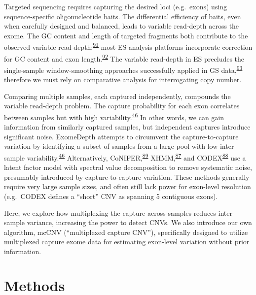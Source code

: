 \documentclass[11pt,letterpaper]{book}
\begin{document}
Targeted sequencing requires capturing the desired loci (e.g.~exons) using sequence-specific oligonucleotide baits.
The differential efficiency of baits, even when carefully designed and balanced, leads to variable read-depth across the exome.
The GC content and length of targeted fragments both contribute to the observed variable read-depth;\textsuperscript{\protect\hyperlink{ref-benjamini:2012aa}{91}} most ES analysis platforms incorporate correction for GC content and exon length.\textsuperscript{\protect\hyperlink{ref-kadalayil:2015aa}{92}}
The variable read-depth in ES precludes the single-sample window-smoothing approaches successfully applied in GS data,\textsuperscript{\protect\hyperlink{ref-chiang:2009aa}{93}} therefore we must rely on comparative analysis for interrogating copy number.

Comparing multiple samples, each captured independently, compounds the variable read-depth problem.
The capture probability for each exon correlates between samples but with high variability.\textsuperscript{\protect\hyperlink{ref-plagnol:2012aa}{46}}
In other words, we can gain information from similarly captured samples, but independent captures introduce significant noise.
ExomeDepth attempts to circumvent the capture-to-capture variation by identifying a subset of samples from a large pool with low inter-sample variability.\textsuperscript{\protect\hyperlink{ref-plagnol:2012aa}{46}}
Alternatively, CoNIFER,\textsuperscript{\protect\hyperlink{ref-krumm:2012aa}{89}} XHMM,\textsuperscript{\protect\hyperlink{ref-fromer:2012aa}{87}} and CODEX\textsuperscript{\protect\hyperlink{ref-jiang:2015aa}{88}} use a latent factor model with spectral value decomposition to remove systematic noise, presumably introduced by capture-to-capture variation.
These methods generally require very large sample sizes, and often still lack power for exon-level resolution (e.g.~CODEX defines a ``short'' CNV as spanning 5 contiguous exons).

Here, we explore how multiplexing the capture across samples reduces inter-sample variance, increasing the power to detect CNVs.
We also introduce our own algorithm, mcCNV (``multiplexed capture CNV''), specifically designed to utilize multiplexed capture exome data for estimating exon-level variation without prior information.

\hypertarget{methods}{%
\section{Methods}\label{methods}}
\end{document}
